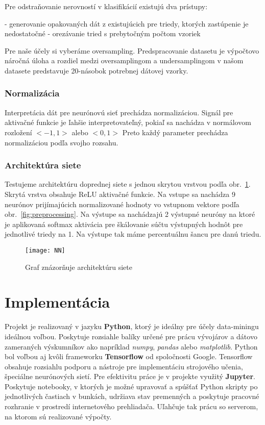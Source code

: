 Pre odstraňovanie nerovností v klasifikácií existujú dva prístupy:
\begin{my_itemize}
	 - generovanie opakovaných dát z existujúcich pre triedy, ktorých zastúpenie je nedostatočné
	 - orezávanie tried s prebytočným počtom vzoriek
\end{my_itemize}

Pre naše účely si vyberáme oversampling. Predspracovanie datasetu je výpočtovo náročná úloha a rozdiel medzi oversamplingom a undersamplingom v našom datasete predstavuje 20-násobok potrebnej dátovej vzorky.


\subsubsection{Normalizácia}
Interpretácia dát pre neurónovú sieť prechádza normalizáciou. Signál pre aktivačné funkcie je ľahšie interpretovateľný, pokiaľ sa nachádza v normálovom rozložení $<-1,1>$ alebo $<0,1>$ Preto každý parameter prechádza normalizáciou podľa svojho rozsahu.

\subsubsection{Architektúra siete}
Testujeme architektúru doprednej siete s jednou skrytou vrstvou podľa obr.~\ref{fig:nn}. Skrytá vrstva obsahuje ReLU aktivačné funkcie. Na vstupe sa nachádza 9 neurónov prijímajúcich normalizované hodnoty vo vstupnom vektore podľa obr.~\ref{fig:preprocessing}. Na výstupe sa nachádzajú 2 výstupné neuróny na ktoré je aplikovaná softmax aktivácia pre škálovanie súčtu výstupných hodnôt pre jednotlivé triedy na 1. Na výstupe tak máme percentuálnu šancu pre danú triedu. \newline

\begin{figure}[H]
	\begin{center}
		\texttt{[image: NN]}\end{center}
	\caption[NN]{Graf znázorňuje architektúru siete}
	\label{fig:nn}
\end{figure}


\section{Implementácia}
\label{implementation}

Projekt je realizovaný v jazyku \textbf{Python}, ktorý je ideálny pre účely data-miningu ideálnou voľbou. Poskytuje rozsiahle balíky určené pre prácu vývojárov a dátovo zameraných výskumníkov ako napríklad \textit{numpy}, \textit{pandas} alebo \textit{matplotlib}. \newline
Python bol voľbou aj kvôli frameworku \textbf{Tensorflow} od spoločnosti Google. Tensorflow obsahuje rozsiahlu podporu a nástroje pre implementáciu strojového učenia, špeciálne neurónových sietí.\newline
Pre efektivitu práce je v projekte využitý \textbf{Jupyter}. Poskytuje notebooky, v ktorých je možné upravovať a spúšťať Python skripty po jednotlivých častiach v bunkách, udržiava stav premenných a poskytuje pracovné rozhranie v prostredí internetového prehliadača. Uľahčuje tak prácu so serverom, na ktorom sú realizované výpočty.